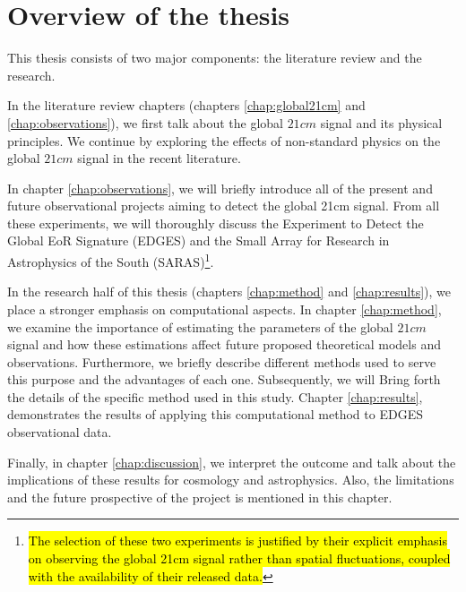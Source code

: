 \documentclass[12pt, TexShade, letterpaper]{report}
\begin{document}
\section{Overview of the thesis}
This thesis consists of two major components: the literature review and the research.\par
In the literature review chapters (chapters \ref{chap:global21cm} and \ref{chap:observations}), we first talk about the global $21cm$ signal and its physical principles. We continue by exploring the effects of non-standard physics on the global $21cm$ signal in the recent literature. \par
In chapter \ref{chap:observations}, we will briefly introduce all of the present and future observational projects aiming to detect the global 21cm signal. From all these experiments, we will thoroughly discuss the Experiment to Detect the Global EoR Signature (EDGES) and the Small Array for Research in Astrophysics of the South (SARAS)\footnote{\hl{The selection of these two experiments is justified by their explicit emphasis on observing the global 21cm signal rather than spatial fluctuations, coupled with the availability of their released data.}}.\par
In the research half of this thesis (chapters \ref{chap:method} and \ref{chap:results}), we place a stronger emphasis on computational aspects. 
In chapter \ref{chap:method}, we examine the importance of estimating the parameters of the global $21cm$ signal and how these estimations affect future proposed theoretical models and observations. Furthermore, we briefly describe different methods used to serve this purpose and the advantages of each one.
Subsequently, we will Bring forth the details of the specific method used in this study. 
Chapter \ref{chap:results}, demonstrates the results of applying this computational method to EDGES observational data.\par

Finally, in chapter \ref{chap:discussion}, we interpret the outcome and talk about the implications of these results for cosmology and astrophysics. Also, the limitations and the future prospective of the project is mentioned in this chapter.\par
\end{document}
